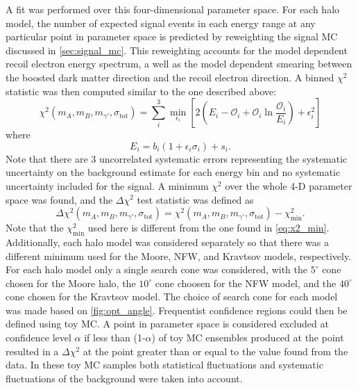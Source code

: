 A fit was performed over this four-dimensional parameter space.  For each halo model, the number of expected signal events in each energy range at any particular point in parameter space is predicted by reweighting the signal MC discussed in \cref{sec:signal_mc}.   This reweighting accounts for the model dependent recoil electron energy spectrum, a well as the model dependent smearing between the boosted dark matter direction and the recoil electron direction.  A binned $\chi^2$ statistic was then computed similar to the one described above:
\begin{equation}
\chi^2(m_A,m_B,m_{\gamma '},\sigma_\textrm{tot})=\sum \limits_i^3 \min \limits_{\epsilon_i}\left[ 2  \left(  E_i-\mathcal{O}_i  + \mathcal{O}_i \ln \frac{ \mathcal{O}_i }{ E_i } \right)
             + \epsilon_i^2\right]
\end{equation}
where
\begin{equation}
E_i=b_i(1+\epsilon_i \sigma_i)+s_i.
\end{equation}
Note that there are 3 uncorrelated systematic errors representing the systematic uncertainty on the background estimate for each energy bin and no systematic uncertainty included for the signal.  A minimum $\chi^2$ over the whole 4-D parameter space was found, and the $\Delta \chi^2$ test statistic was defined as
\begin{equation}
\Delta \chi^2(m_A,m_B,m_{\gamma '},\sigma_\textrm{tot})=\chi^2(m_A,m_B,m_{\gamma '},\sigma_\textrm{tot})-\chi^2_\textrm{min}.
\end{equation} 
Note that the $\chi^2_\textrm{min}$ used here is different from the one found in \cref{eq:x2_min}.  Additionally, each halo model was considered separately so that there was a different minimum used for the Moore, NFW, and Kravtsov models, respectively.  For each halo model only a single search cone was considered, with the $5^\circ$ cone chosen for the Moore halo, the $10^\circ$ cone choosen for the NFW model, and the $40^\circ$ cone chosen for the Kravtsov model.  The choice of search cone for each model was made based on \cref{fig:opt_angle}.   Frequentist confidence regions could then be defined using toy MC.  A point in parameter space is considered excluded at confidence level $\alpha$ if less than (1-$\alpha$) of toy MC ensembles produced at the point resulted in a $\Delta \chi^2$ at the point greater than or equal to the value found from the data.   In these toy MC samples both statistical fluctuations and systematic fluctuations of the background were taken into account.

